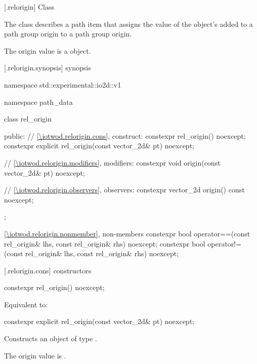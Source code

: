  [\iotwod.relorigin] {Class }

\pnum
{}%
The class  describes a path item that assigns the value of the  object's  added to a path group origin to a path group origin.

\pnum
The origin value is a  object.

 [\iotwod.relorigin.synopsis] { synopsis}

\begin{codeblock}
namespace std::experimental::io2d::v1 {
  namespace path_data {
    class rel_origin {
    public:
      // \ref{\iotwod.relorigin.cons}, construct:
      constexpr rel_origin() noexcept;
      constexpr explicit rel_origin(const vector_2d& pt) noexcept;

      // \ref{\iotwod.relorigin.modifiers}, modifiers:
      constexpr void origin(const vector_2d& pt) noexcept;

      // \ref{\iotwod.relorigin.observers}, observers:
      constexpr vector_2d origin() const noexcept;
    };
    
    \ref{\iotwod.relorigin.nonmember}, non-members
    constexpr bool operator==(const rel_origin& lhs,
      const rel_origin& rhs) noexcept;
    constexpr bool operator!=(const rel_origin& lhs,
      const rel_origin& rhs) noexcept;
  }
}
\end{codeblock}

 [\iotwod.relorigin.cons] { constructors}

%
\begin{itemdecl}
constexpr rel_origin() noexcept;
\end{itemdecl}
\begin{itemdescr}
\pnum
\effects
Equivalent to: 
\end{itemdescr}

%
\begin{itemdecl}
constexpr explicit rel_origin(const vector_2d& pt) noexcept;
\end{itemdecl}
\begin{itemdescr}
\pnum
\effects
Constructs an object of type .

\pnum
The origin value is .
\end{itemdescr}


